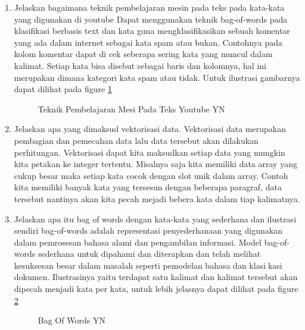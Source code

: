 \begin{enumerate}
\item Jelaskan bagaimana teknik pembelajaran mesin pada teks pada kata-kata yang digunakan di youtube
Dapat menggunakan teknik bag-of-words pada klasifikasi berbasis text dan kata guna mengklasifikasikan sebuah komentar yang ada dalam internet sebagai kata spam atau bukan. Contohnya pada kolom komentar dapat di cek seberapa sering kata yang muncul dalam kalimat. Setiap kata bisa disebut sebagai baris dan kolomnya, hal ini merupakan dimana kategori kata spam atau tidak. Untuk ilustrasi gambarnya dapat dilihat pada figure \ref{YNC4-3}

	\begin{figure}[ht]
		\caption{Teknik Pembelajaran Mesi Pada Teks Youtube YN}
		\label{YNC4-3}
	\end{figure}


\item Jelaskan apa yang dimaksud vektorisasi data.
Vektorisasi data merupakan pembagian dan pemecahan data lalu data tersebut akan dilakukan perhitungan. Vektorisasi dapat kita maksudkan setiap data yang mungkin kita petakan ke integer tertentu. Misalnya saja kita memiliki data array yang cukup besar maka setiap kata cocok dengan slot unik dalam array. Contoh kita memiliki banyak kata yang tersesun dengan beberapa paragraf, data tersebut nantinya akan kita pecah mejadi bebera kata dalam tiap kalimatnya.

\item Jelaskan apa itu bag of words dengan kata-kata yang sederhana dan ilustrasi sendiri
bag-of-words adalah representasi penyederhanaan yang digunakan dalam pemrosesan bahasa alami dan pengambilan informasi. Model bag-of-words sederhana untuk dipahami dan diterapkan dan telah melihat kesuksesan besar dalam masalah seperti pemodelan bahasa dan klasikasi dokumen. Ilustrasinya yaitu terdapat satu kalimat dan kalimat tersebut akan dipecah menjadi kata per kata, untuk lebih jelasnya dapat dilihat pada figure \ref{YNC4-4}

	\begin{figure}[ht]
		\caption{Bag Of Words YN}
		\label{YNC4-4}
	\end{figure}


\end{enumerate}

